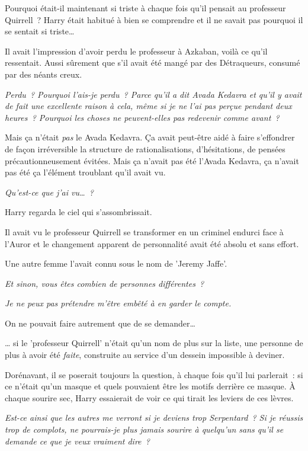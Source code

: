 Pourquoi était-il maintenant si triste à chaque fois qu'il pensait au professeur Quirrell~? Harry était habitué à bien se comprendre et il ne savait pas pourquoi il se sentait si triste…

Il avait l'impression d'avoir perdu le professeur à Azkaban, voilà ce qu'il ressentait. Aussi sûrement que s'il avait été mangé par des Détraqueurs, consumé par des néants creux.

\emph{Perdu~? Pourquoi l'ais-je perdu~? Parce qu'il a dit Avada Kedavra et qu'il y avait de fait une excellente raison à cela, même si je ne l'ai pas perçue pendant deux heures~? Pourquoi les choses ne peuvent-elles pas redevenir comme avant~?}

Mais ça n'était \emph{pas} le Avada Kedavra. Ça avait peut-être aidé à faire s'effondrer de façon irréversible la structure de rationalisations, d'hésitations, de pensées précautionneusement évitées. Mais ça n'avait pas été l'Avada Kedavra, ça n'avait pas été ça l'élément troublant qu'il avait vu.

\emph{Qu'est-ce que j'ai vu…~?}

Harry regarda le ciel qui s'assombrissait.

Il avait vu le professeur Quirrell se transformer en un criminel endurci face à l'Auror et le changement apparent de personnalité avait été absolu et sans effort.

Une autre femme l'avait connu sous le nom de 'Jeremy Jaffe'.

\emph{Et sinon, vous êtes combien de personnes différentes~?}

\emph{Je ne peux pas prétendre m'être embêté à en garder le compte.}

On ne pouvait faire autrement que de se demander…

… si le 'professeur Quirrell' n'était qu'un nom de plus sur la liste, une personne de plus à avoir été \emph{faite}, construite au service d'un dessein impossible à deviner.

Dorénavant, il se poserait toujours la question, à chaque fois qu'il lui parlerait~: si ce n'était qu'un masque et quels pouvaient être les motifs derrière ce masque. À chaque sourire sec, Harry essaierait de voir ce qui tirait les leviers de ces lèvres.

\emph{Est-ce ainsi que les autres me verront si je deviens trop Serpentard~? Si je réussis trop de complots, ne pourrais-je plus jamais sourire à quelqu'un sans qu'il se demande ce que je veux vraiment dire~?}

